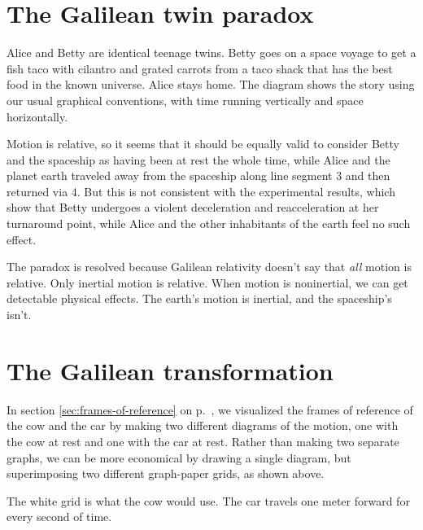 \section{The Galilean twin paradox}\label{sec:galilean-twin-paradox}

Alice and Betty are identical teenage twins. Betty goes on a space voyage to get a fish taco with
cilantro and grated carrots from a
taco shack that has the best food in the known universe. Alice stays home. The diagram shows the story using our usual
graphical conventions, with time running vertically and space horizontally.




Motion is relative, so it seems that it should be equally valid to consider Betty
and the spaceship as having been at rest the whole time, while
Alice and the planet earth traveled away from the spaceship along
line segment 3 and then returned via 4. But this is not consistent with the
experimental results, which show that Betty undergoes a violent
deceleration and reacceleration at her turnaround point, while Alice and the other
inhabitants of the earth feel no such effect.

The paradox is resolved because Galilean relativity doesn't say that \emph{all}
motion is relative. Only inertial motion is relative. When motion is noninertial, we can get detectable
physical effects. The earth's motion is inertial, and the spaceship's isn't.


\pagebreak

\section{The Galilean transformation}\label{sec:galilean-transformation}




In section \ref{sec:frames-of-reference} on p.~\pageref{sec:frames-of-reference}, we visualized the frames of reference
of the cow and the car by making two different diagrams of the motion, one with the cow at rest and one with the car
at rest. Rather than making two separate graphs, we can be more economical by drawing a single diagram,
but superimposing two different graph-paper grids, as shown above.

The white grid is what the cow would use.
The car travels one meter
forward for every second of time.

